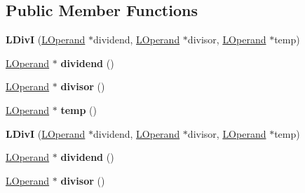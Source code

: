 \subsection*{Public Member Functions}
\begin{DoxyCompactItemize}
\item 
{\bfseries L\+DivI} (\hyperlink{classv8_1_1internal_1_1_l_operand}{L\+Operand} $\ast$dividend, \hyperlink{classv8_1_1internal_1_1_l_operand}{L\+Operand} $\ast$divisor, \hyperlink{classv8_1_1internal_1_1_l_operand}{L\+Operand} $\ast$temp)\hypertarget{classv8_1_1internal_1_1_l_div_i_a2c447a721208972b1aa2bbbdf5ae58c9}{}\label{classv8_1_1internal_1_1_l_div_i_a2c447a721208972b1aa2bbbdf5ae58c9}

\item 
\hyperlink{classv8_1_1internal_1_1_l_operand}{L\+Operand} $\ast$ {\bfseries dividend} ()\hypertarget{classv8_1_1internal_1_1_l_div_i_a324dcd2105a5772942591b32a93edf8c}{}\label{classv8_1_1internal_1_1_l_div_i_a324dcd2105a5772942591b32a93edf8c}

\item 
\hyperlink{classv8_1_1internal_1_1_l_operand}{L\+Operand} $\ast$ {\bfseries divisor} ()\hypertarget{classv8_1_1internal_1_1_l_div_i_a5ceb6d1f5a2f1f0c998966e525a2cb3c}{}\label{classv8_1_1internal_1_1_l_div_i_a5ceb6d1f5a2f1f0c998966e525a2cb3c}

\item 
\hyperlink{classv8_1_1internal_1_1_l_operand}{L\+Operand} $\ast$ {\bfseries temp} ()\hypertarget{classv8_1_1internal_1_1_l_div_i_ab28d8d7ab78227bb8dcc89a205a7c7be}{}\label{classv8_1_1internal_1_1_l_div_i_ab28d8d7ab78227bb8dcc89a205a7c7be}

\item 
{\bfseries L\+DivI} (\hyperlink{classv8_1_1internal_1_1_l_operand}{L\+Operand} $\ast$dividend, \hyperlink{classv8_1_1internal_1_1_l_operand}{L\+Operand} $\ast$divisor, \hyperlink{classv8_1_1internal_1_1_l_operand}{L\+Operand} $\ast$temp)\hypertarget{classv8_1_1internal_1_1_l_div_i_a2c447a721208972b1aa2bbbdf5ae58c9}{}\label{classv8_1_1internal_1_1_l_div_i_a2c447a721208972b1aa2bbbdf5ae58c9}

\item 
\hyperlink{classv8_1_1internal_1_1_l_operand}{L\+Operand} $\ast$ {\bfseries dividend} ()\hypertarget{classv8_1_1internal_1_1_l_div_i_a324dcd2105a5772942591b32a93edf8c}{}\label{classv8_1_1internal_1_1_l_div_i_a324dcd2105a5772942591b32a93edf8c}

\item 
\hyperlink{classv8_1_1internal_1_1_l_operand}{L\+Operand} $\ast$ {\bfseries divisor} ()\hypertarget{classv8_1_1internal_1_1_l_div_i_a5ceb6d1f5a2f1f0c998966e525a2cb3c}{}\label{classv8_1_1internal_1_1_l_div_i_a5ceb6d1f5a2f1f0c998966e525a2cb3c}


\end{DoxyCompactItemize}
